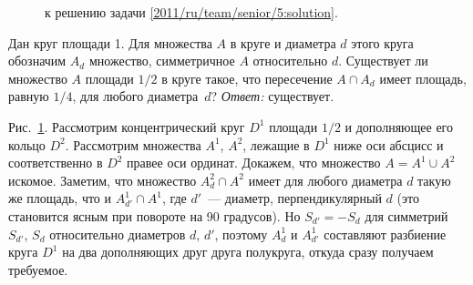 \ifsolution
\begin{figure}\centering
    \caption{к решению задачи \ref{2011/ru/team/senior/5:solution}.}
    \label{2011/ru/team/senior/5:solution:fig}
\end{figure}%
\fi %

\problem{}
Дан круг площади 1.
Для множества $A$ в круге и диаметра $d$ этого круга обозначим $A_d$ множество,
симметричное $A$ относительно $d$.
Существует ли множество $A$ площади $1 / 2$ в круге такое, что пересечение
$A \cap A_d$ имеет площадь, равную $1/4$, для любого диаметра~$d$?
\solution
\label{2011/ru/team/senior/5:solution}%
\emph{Ответ:} существует.
\par
Рис.~\ref{2011/ru/team/senior/5:solution:fig}.
Рассмотрим концентрический круг $D^1$ площади $1 / 2$ и дополняющее его кольцо
$D^2$.
Рассмотрим множества $A^1$, $A^2$, лежащие в $D^1$ ниже оси абсцисс и
соответственно в $D^2$ правее оси ординат.
Докажем, что множество $A = A^1 \cup A^2$ искомое.
Заметим, что множество $A^2_d \cap A^2$ имеет для любого диаметра $d$ такую же
площадь, что и $A^1_{d'} \cap A^1$, где $d'$~--- диаметр, перпендикулярный $d$
(это становится ясным при повороте на 90 градусов).
Но $S_{d'} = -S_d$ для симметрий $S_{d'}$, $S_d$ относительно диаметров $d$,
$d'$, поэтому $A^1_d$ и $A^1_{d'}$ составляют разбиение круга $D^1$ на два
дополняющих друг друга полукруга, откуда сразу получаем требуемое.
\endproblem
